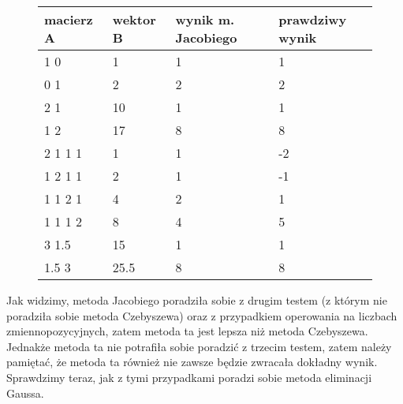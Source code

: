 \documentclass[a4paper]{article}
\begin{document}
\begin{figure}[H]
\begin{tabular}{|l|l|l|l|}
\hline
macierz A & wektor B & wynik m. Jacobiego & prawdziwy wynik \\
\hline
1 0 & 1 & 1 & 1 \\
0 1 & 2 & 2 & 2 \\
\hline
2 1 & 10 & 1 & 1 \\
1 2 & 17 & 8 & 8 \\
\hline
2 1 1 1 & 1 & 1 & -2 \\
1 2 1 1 & 2 & 1 & -1 \\
1 1 2 1 & 4 & 2 & 1 \\
1 1 1 2 & 8 & 4 & 5 \\
\hline
3 1.5 & 15 & 1 & 1 \\
1.5 3 & 25.5 & 8 & 8 \\
\hline
\end{tabular}
\end{figure}
Jak widzimy, metoda Jacobiego poradziła sobie z drugim testem (z którym nie poradziła sobie metoda Czebyszewa) oraz z przypadkiem operowania na liczbach zmiennopozycyjnych,  zatem metoda ta jest lepsza niż metoda Czebyszewa. Jednakże metoda ta nie potrafiła sobie poradzić z trzecim testem, zatem należy pamiętać, że metoda ta również nie zawsze będzie zwracała dokładny wynik. Sprawdzimy teraz, jak z tymi przypadkami poradzi sobie metoda eliminacji Gaussa.
\end{document}
